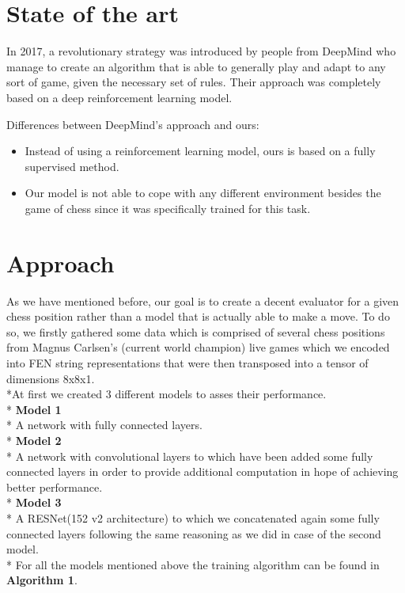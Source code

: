 \documentclass[runningheads,a4paper,11pt]{report}
\begin{document}
\chapter{State of the art}
\label{chapter:stateOfArt}


In 2017, a revolutionary strategy was introduced by people from DeepMind who manage to create an algorithm that is able to generally play and adapt to any sort of game, given the necessary set of rules. Their approach was completely based on a deep reinforcement learning model.

Differences between DeepMind's approach and ours:
\begin{itemize}
	 \item Instead of using a reinforcement learning model, ours is based on a fully supervised method.
	 \item Our model is not able to cope with any different environment besides the game of chess since it was specifically trained for this task. 
\end{itemize}

\chapter{Approach}


    As we have mentioned before, our goal is to create a decent evaluator for a given chess position rather than a model that is actually able to make a move. To do so, we firstly gathered some data which is comprised of several chess positions from Magnus Carlsen's (current world champion) live games which we encoded into FEN string representations that were then transposed into a tensor of dimensions 8x8x1.
    \\*At first we created 3 different models to asses their performance. 
    \\* \textbf{Model 1}
    \\* A network with fully connected layers.
    \\* \textbf{Model 2}
    \\* A network with convolutional layers to which have been added some fully connected layers in order to provide additional computation in hope of achieving better performance.
    \\* \textbf{Model 3}
    \\* A RESNet(152 v2 architecture) to which we concatenated again some fully connected layers following the same reasoning as we did in case of the second model.
    \\* For all the models mentioned above the training algorithm can be found in \textbf{Algorithm 1}.
\end{document}
